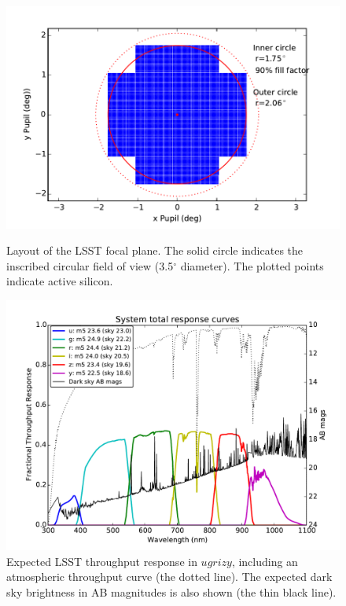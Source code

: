 \documentclass{iau}
\begin{document}
\begin{figure}[tb]
\begin{minipage}{.5\textwidth}
\begin{center}
\includegraphics[width=0.9\linewidth]{focalplane}
\captionsetup{width=0.9\linewidth}
\caption{Layout of the LSST focal plane. The solid circle indicates
  the inscribed circular field of view (3.5$^\circ$ diameter). The
  plotted points indicate active silicon.\label{focalplane}}
\end{center}
\end{minipage}
\begin{minipage}{.5\textwidth}
\begin{center}
\includegraphics[width=0.9\linewidth]{throughputs}
\captionsetup{width=0.9\linewidth}
\caption{Expected LSST throughput response in $ugrizy$, including
  an atmospheric throughput curve (the dotted line). The
  expected dark sky brightness in AB magnitudes is also shown (the
  thin black line).
\label{throughputs}}
\end{center}
\end{minipage}
\end{figure}
\end{document}
